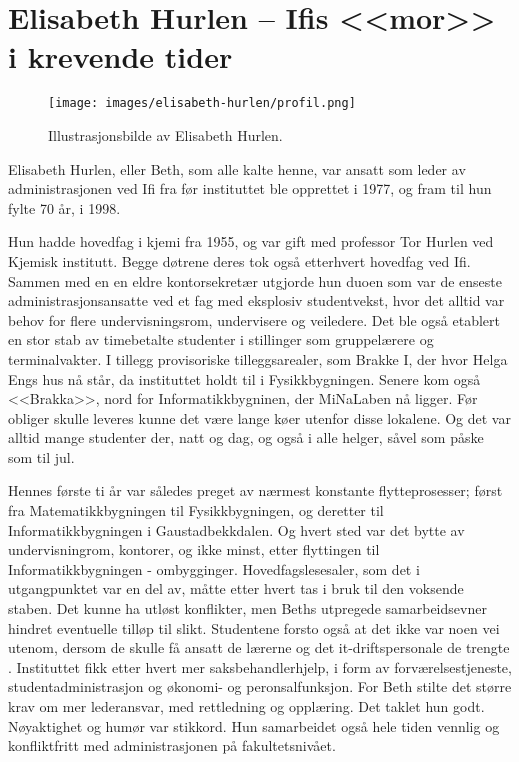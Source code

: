 \chapter[Elisabeth Hurlen]{Elisabeth Hurlen – Ifis <<mor>> i krevende tider}

\author{Skrevet av Narve Trædal}

\begin{wrapfigure}{l}{7cm}
	\centering
	\texttt{[image: images/elisabeth-hurlen/profil.png]}
	\label{fig:elisabeth-hurlen}
	\caption{Illustrasjonsbilde av Elisabeth Hurlen.}
\end{wrapfigure}

Elisabeth Hurlen, eller Beth, som alle kalte henne, var ansatt som leder av administrasjonen ved Ifi fra før instituttet ble opprettet i 1977, og fram til hun fylte 70 år, i 1998.

Hun hadde hovedfag i kjemi fra 1955, og var gift med professor Tor Hurlen ved Kjemisk institutt. Begge døtrene deres tok også etterhvert hovedfag ved Ifi. Sammen med en en eldre kontorsekretær utgjorde hun duoen som var de enseste administrasjonsansatte ved et fag med eksplosiv studentvekst, hvor det alltid var behov for flere undervisningsrom, undervisere og veiledere. Det ble også etablert en stor stab av timebetalte studenter i stillinger som gruppelærere og terminalvakter. I tillegg provisoriske tilleggsarealer, som Brakke I, der hvor Helga Engs hus nå står, da instituttet holdt til i Fysikkbygningen. Senere kom også <<Brakka>>, nord for Informatikkbygninen, der MiNaLaben nå ligger. Før obliger skulle leveres kunne det være lange køer utenfor disse lokalene. Og det var alltid mange studenter der, natt og dag, og også i alle helger, såvel som påske som til jul.

Hennes første ti år var således preget av nærmest konstante flytteprosesser; først fra Matematikkbygningen til Fysikkbygningen, og deretter til Informatikkbygningen i Gaustadbekkdalen. Og hvert sted var det bytte av undervisningrom, kontorer, og ikke minst, etter flyttingen til Informatikkbygningen - ombygginger. Hovedfagslesesaler, som det i utgangpunktet var en del av, måtte etter hvert tas i bruk til den voksende staben. Det kunne ha utløst konflikter, men Beths utpregede samarbeidsevner hindret eventuelle tilløp til slikt. Studentene forsto også at det ikke var noen vei utenom, dersom de skulle få ansatt de lærerne og det it-driftspersonale de trengte . Instituttet fikk etter hvert mer saksbehandlerhjelp, i form av forværelsestjeneste, studentadministrasjon og økonomi- og peronsalfunksjon. For Beth stilte det større krav om mer lederansvar, med rettledning og opplæring. Det taklet hun godt. Nøyaktighet og humør var stikkord. Hun samarbeidet også hele tiden vennlig og konfliktfritt med administrasjonen på fakultetsnivået.

